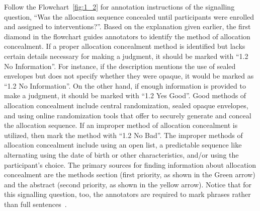 \documentclass[sn-mathphys,Numbered]{sn-jnl}%
\begin{document}
Follow the Flowchart~\ref{fig:1_2} for annotation instructions of the signalling question, ``Was the allocation sequence concealed until participants were enrolled and assigned to interventions?''.
Based on the explanation given earlier, the first diamond in the flowchart guides annotators to identify the method of allocation concealment. If a proper allocation concealment method is identified but lacks certain details necessary for making a judgment, it should be marked with ``1.2 No Information''.
For instance, if the description mentions the use of sealed envelopes but does not specify whether they were opaque, it would be marked as ``1.2 No Information''.
On the other hand, if enough information is provided to make a judgment, it should be marked with ``1.2 Yes Good''.
Good methods of allocation concealment include central randomization, sealed opaque envelopes, and using online randomization tools that offer to securely generate and conceal the allocation sequence.
If an improper method of allocation concealment is utilized, then mark the method with ``1.2 No Bad''.
The improper methods of allocation concealment include using an open list, a predictable sequence like alternating using the date of birth or other characteristics, and/or using the participant's choice.
The primary sources for finding information about allocation concealment are the methods section (first priority, as shown in the Green arrow) and the abstract (second priority, as shown in the yellow arrow).
Notice that for this signalling question, too, the annotators are required to mark phrases rather than full sentences~\cite{sterne2019rob,rahim2021effect}.


%
%
%
\end{document}
